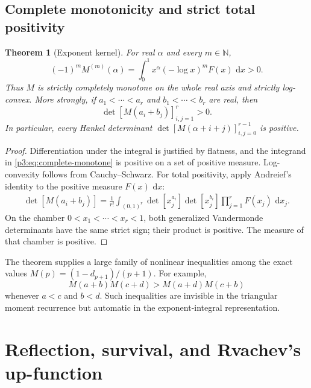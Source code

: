 \documentclass[11pt,oneside]{article}
\newtheorem{theorem}{Theorem}[section]
\theoremstyle{definition}
\theoremstyle{remark}
\newcommand{\N}{\mathbb N}
\newcommand{\dd}{\,\mathrm d}
\newcommand{\1}{\mathbf 1}
\begin{document}
\subsection{Complete monotonicity and strict total positivity}

\begin{theorem}[Exponent kernel]
\label{p3:thm:total-positive}
For real $\alpha$ and every $m\in\N$,
\begin{equation}
 (-1)^mM^{(m)}(\alpha)
 =\int_0^1x^\alpha(-\log x)^mF(x)\,\dd x>0.                  \label{p3:eq:complete-monotone}
\end{equation}
Thus $M$ is strictly completely monotone on the whole real axis and strictly log-convex.
More strongly, if
\(a_1<\cdots<a_r\) and \(b_1<\cdots<b_r\) are real, then
\begin{equation}
 \det[M(a_i+b_j)]_{i,j=1}^r>0.                               \label{p3:eq:strict-TP}
\end{equation}
In particular, every Hankel determinant
$\det[M(\alpha+i+j)]_{i,j=0}^{r-1}$ is positive.
\end{theorem}

\begin{proof}
Differentiation under the integral is justified by flatness, and the integrand in
\eqref{p3:eq:complete-monotone} is positive on a set of positive measure.  Log-convexity follows
from Cauchy--Schwarz.  For total positivity, apply Andreief's identity to the positive
measure $F(x)\,\dd x$:
\begin{align*}
 \det[M(a_i+b_j)]
 =\frac1{r!}\int_{(0,1)^r}
 \det[x_j^{a_i}]\det[x_j^{b_i}]\prod_{j=1}^rF(x_j)\,\dd x_j.
\end{align*}
On the chamber $0<x_1<\cdots<x_r<1$, both generalized Vandermonde determinants have the
same strict sign; their product is positive.  The measure of that chamber is positive.
\end{proof}

\begin{remark}
The theorem supplies a large family of nonlinear inequalities among the exact values
$M(p)=(1-d_{p+1})/(p+1)$.  For example,
\[
 M(a+b)M(c+d)>M(a+d)M(c+b)
\]
whenever $a<c$ and $b<d$.  Such inequalities are invisible in the triangular moment
recurrence but automatic in the exponent-integral representation.
\end{remark}

\section{Reflection, survival, and Rvachev's up-function}
\label{p3:sec:up}
\end{document}
